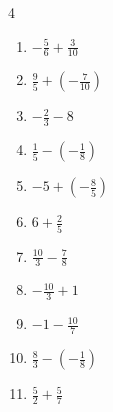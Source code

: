 \begin{multicols}{4}
\begin{enumerate}

  \item $\displaystyle -\frac{5}{6} + \frac{3}{10}$


  \item $\displaystyle \frac{9}{5} + \left(-\frac{7}{10}\right)$


  \item $\displaystyle -\frac{2}{3} - 8$


  \item $\displaystyle \frac{1}{5} - \left(-\frac{1}{8}\right)$


  \item $\displaystyle -5 + \left(-\frac{8}{5}\right)$


  \item $\displaystyle 6 + \frac{2}{5}$


\columnbreak %

\resetques

  \item $\displaystyle \frac{10}{3} - \frac{7}{8}$


  \item $\displaystyle -\frac{10}{3} + 1$


  \item $\displaystyle -1 - \frac{10}{7}$


  \item $\displaystyle \frac{8}{3} - \left(-\frac{1}{8}\right)$


  \item $\displaystyle \frac{5}{2} + \frac{5}{7}$



\end{enumerate}
\end{multicols}
